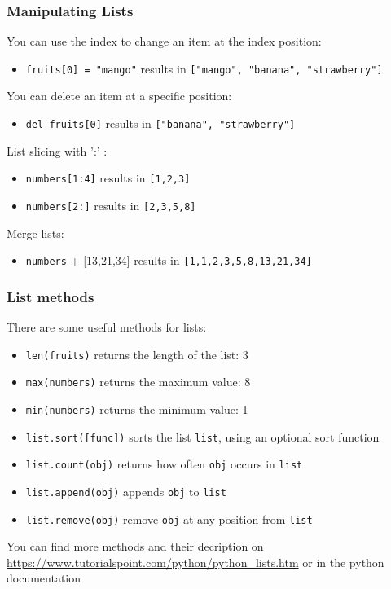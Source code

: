 \documentclass{beamer}
\begin{document}
\begin{frame}
\frametitle{Manipulating Lists}
	You can use the index to change an item at the index position:
	\begin{itemize}
	\item \texttt{fruits[0] = "mango"} results in \texttt{["mango", "banana", "strawberry"]}
	\end{itemize}
	You can delete an item at a specific position:
	\begin{itemize}
	\item \texttt{del fruits[0]} results in \texttt{["banana", "strawberry"]}
	\end{itemize}
	List slicing with ':' :
	\begin{itemize}
	\item \texttt{numbers[1:4]} results in \texttt{[1,2,3]}
	\item \texttt{numbers[2:]} results in \texttt{[2,3,5,8]}
	\end{itemize}
	Merge lists:
	\begin{itemize}
	\item \texttt{numbers} + [13,21,34] results in \texttt{[1,1,2,3,5,8,13,21,34]}
	\end{itemize}
\end{frame}

\begin{frame}
\frametitle{List methods}
	There are some useful methods for lists:
	\begin{itemize}
	\item \texttt{len(fruits)} returns the length of the list: 3
	\item \texttt{max(numbers)} returns the maximum value: 8
	\item \texttt{min(numbers)} returns the minimum value: 1
	\item \texttt{list.sort([func])} sorts the list \texttt{list}, using an optional sort function
	\item \texttt{list.count(obj)} returns how often \texttt{obj} occurs in \texttt{list}
	\item \texttt{list.append(obj)} appends \texttt{obj} to \texttt{list}
	\item \texttt{list.remove(obj)} remove \texttt{obj} at any position from \texttt{list}
	\end{itemize}
	You can find more methods and their decription on \url{https://www.tutorialspoint.com/python/python_lists.htm} or in the python documentation
\end{frame}
\end{document}
